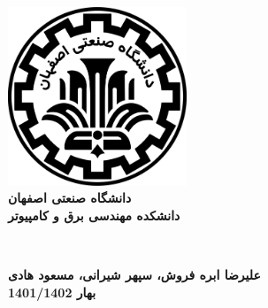 \begin{titlepage}
\begin{center}
\includegraphics[width=0.4\textwidth]{figures/IUT Logo.png}\\
        
\LARGE
\textbf{دانشگاه صنعتی اصفهان}\\
\textbf{دانشکده مهندسی برق و کامپیوتر}\\
        
\vfill
        
\huge
\textbf{}\\
        
\vfill
        
\LARGE

\textbf{علیرضا ابره فروش، سپهر شیرانی، مسعود هادی}\\
\textbf{بهار 1401/1402}\\
\end{center}
\end{titlepage}

